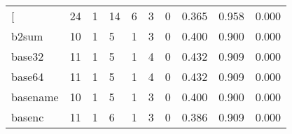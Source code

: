 \begin{longtable}{lp{1.3cm}p{1.3cm}p{1.3cm}p{1.3cm}p{1.3cm}p{1.3cm}p{1.3cm}p{1.3cm}p{1.3cm}}
\bottomrule
\endlastfoot
{[}         &                     24 &                                             1 &                                           14 &                                           6 &                                            3 &                                          0 &                                0.365 &                                  0.958 &                                0.000 \\
b2sum     &                     10 &                                             1 &                                            5 &                                           1 &                                            3 &                                          0 &                                0.400 &                                  0.900 &                                0.000 \\
base32    &                     11 &                                             1 &                                            5 &                                           1 &                                            4 &                                          0 &                                0.432 &                                  0.909 &                                0.000 \\
base64    &                     11 &                                             1 &                                            5 &                                           1 &                                            4 &                                          0 &                                0.432 &                                  0.909 &                                0.000 \\
basename  &                     10 &                                             1 &                                            5 &                                           1 &                                            3 &                                          0 &                                0.400 &                                  0.900 &                                0.000 \\
basenc    &                     11 &                                             1 &                                            6 &                                           1 &                                            3 &                                          0 &                                0.386 &                                  0.909 &                                0.000 \\

\end{longtable}
